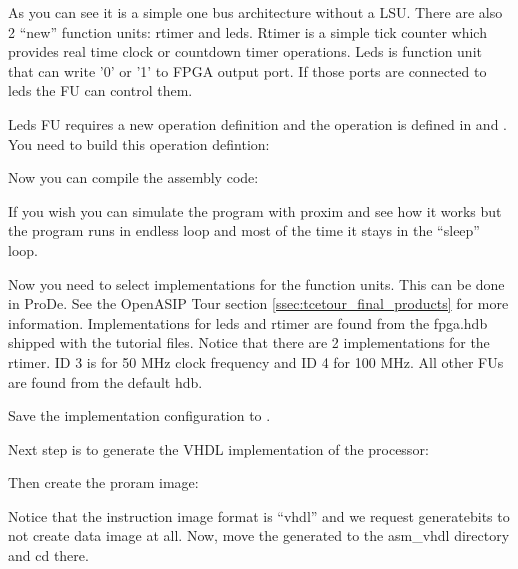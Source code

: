 \documentclass[a4paper,twoside]{tceusermanual}
\begin{document}

As you can see it is a simple one bus architecture without a LSU. There are
also 2 ``new'' function units: rtimer and leds. Rtimer is a simple tick
counter which provides real time clock or countdown timer operations. Leds is
function unit that can write '0' or '1' to FPGA output port. If those ports
are connected to leds the FU can control them.

Leds FU requires a new operation definition and the operation is defined in
 and . You need to build this operation defintion:


Now you can compile the assembly code:


If you wish you can simulate the program with proxim and see how it works but
the program runs in endless loop and most of the time it stays in the
``sleep'' loop.

Now you need to select implementations for the function units. This can be
done in ProDe. See the OpenASIP Tour section \ref{ssec:tcetour_final_products} for more
information. Implementations for leds and rtimer are found from the fpga.hdb
shipped with the tutorial files. Notice that there are 2 implementations for
the rtimer. ID 3 is for 50 MHz clock frequency and ID 4 for 100 MHz. All other
FUs are found from the default hdb.

Save the implementation configuration to .


Next step is to generate the VHDL implementation of the processor:



Then create the proram image:



Notice that the instruction image format is ``vhdl'' and we request
generatebits to not create data image at all. Now, move the generated 
 to the asm\_vhdl directory and cd there.
\end{document}
